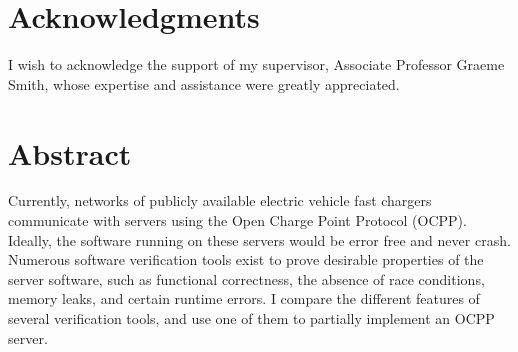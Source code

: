 \documentclass[12pt,openany,a4paper]{book}
\begin{document}
\cleardoublepage


\chapter{Acknowledgments}

I wish to acknowledge the support of my supervisor, Associate Professor Graeme Smith, whose expertise and assistance were greatly appreciated.
\cleardoublepage

\chapter{Abstract}

Currently, networks of publicly available electric vehicle fast chargers communicate with servers using the Open Charge Point Protocol (OCPP). Ideally, the software running on these servers would be error free and never crash. Numerous software verification tools exist to prove desirable properties of the server software, such as functional correctness, the absence of race conditions, memory leaks, and certain runtime errors. I compare the different features of several verification tools, and use one of them to partially implement an OCPP server.

\tableofcontents

\listoffigures
{}

\listoftables
{}

% 

\cleardoublepage

\mainmatter


%
%
%
%	
%	
\end{document}

